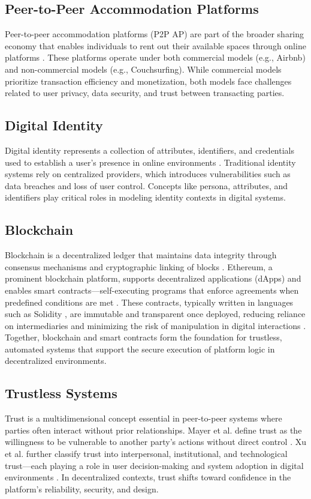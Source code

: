 \documentclass[conference]{IEEEtran}
\begin{document}
\subsection{Peer-to-Peer Accommodation Platforms}
Peer-to-peer accommodation platforms (P2P AP) are part of the broader sharing economy that enables individuals to rent out their available spaces through online platforms \cite{cesnuityte2022}. These platforms operate under both commercial models (e.g., Airbnb) and non-commercial models (e.g., Couchsurfing). While commercial models prioritize transaction efficiency and monetization, both models face challenges related to user privacy, data security, and trust between transacting parties.

\subsection{Digital Identity}
Digital identity represents a collection of attributes, identifiers, and credentials used to establish a user’s presence in online environments \cite{wang2019}. Traditional identity systems rely on centralized providers, which introduces vulnerabilities such as data breaches and loss of user control. Concepts like persona, attributes, and identifiers play critical roles in modeling identity contexts in digital systems.

\subsection{Blockchain}
Blockchain is a decentralized ledger that maintains data integrity through consensus mechanisms and cryptographic linking of blocks \cite{nakamoto2008}. Ethereum, a prominent blockchain platform, supports decentralized applications (dApps) and enables smart contracts—self-executing programs that enforce agreements when predefined conditions are met \cite{buterin2014, wood2022, antonopoulos2019, bhushan2021}. These contracts, typically written in languages such as Solidity \cite{solidity2024}, are immutable and transparent once deployed, reducing reliance on intermediaries and minimizing the risk of manipulation in digital interactions \cite{raj2019}. Together, blockchain and smart contracts form the foundation for trustless, automated systems that support the secure execution of platform logic in decentralized environments.

\subsection{Trustless Systems}
Trust is a multidimensional concept essential in peer-to-peer systems where parties often interact without prior relationships. Mayer et al. define trust as the willingness to be vulnerable to another party’s actions without direct control \cite{mayer1995}. Xu et al. further classify trust into interpersonal, institutional, and technological trust—each playing a role in user decision-making and system adoption in digital environments \cite{xu2014}. In decentralized contexts, trust shifts toward confidence in the platform's reliability, security, and design.
\end{document}
